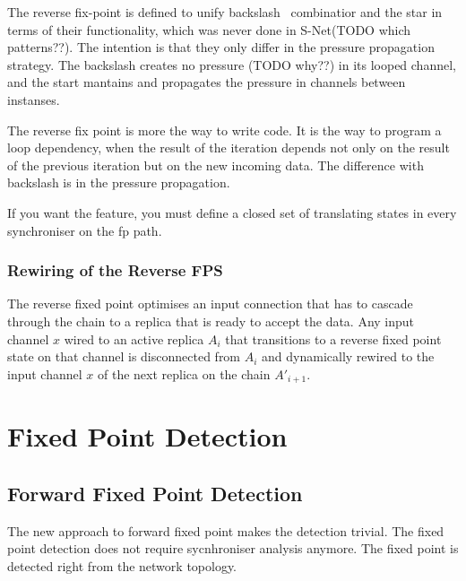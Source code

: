 The reverse fix-point is defined to unify backslash \ combinatior and the star in terms of their functionality, which was never done in S-Net(TODO which patterns??). The intention is that they only differ in the pressure propagation strategy. The backslash creates no pressure (TODO why??) in its looped channel, and the start mantains and propagates the pressure in channels between instanses.

%
%
%
%

The reverse fix point is more the way to write code. It is the way to program a loop dependency, when the result of the iteration depends not only on the result of the previous iteration but on the new incoming data. The difference with backslash is in the pressure propagation.

If you want the feature, you must define a closed set of translating states in every synchroniser on the fp path.


\subsubsection{Rewiring of the Reverse FPS}
The reverse fixed point optimises an input connection that has to cascade through the chain to a replica that is ready to accept the data. Any input channel $x$ wired to an active replica $A_i$ that transitions to a reverse fixed point state on that channel is disconnected from $A_i$ and dynamically rewired to the input channel $x$ of the next replica on the chain $A'_{i+1}$.


    \section{Fixed Point Detection\label{fp_detect}}

    \subsection{Forward Fixed Point Detection\label{ffp_detect}}
The new approach to forward fixed point makes the detection trivial. The fixed point detection does not require sycnhroniser analysis anymore. The fixed point is detected right from the network topology.


